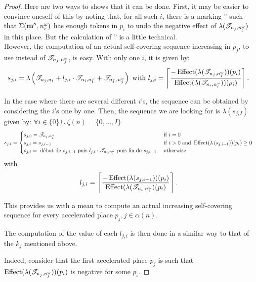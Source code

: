 \begin{proof}
  Here are two ways to shows that it can be done.
  First, it may be easier to convince oneself of this by noting that, for all such $i$, there is a marking \mar'' such that $\Sigma(\mathbf{m}'', n^\omega_i)$ has enough tokens in $p_i$ to undo the negative effect of $\lambda(\mathscr{T}_{n_j,n^\omega_j})$ in this place. But the calculation of \mar'' is a little technical.\\
   However, the computation of an actual self-covering sequence increasing in $p_j$, to use instead of $\mathscr{T}_{n_j, n^\omega_j}$, is easy. With only one $i$, it is given by:
   \[
     s_{j,i} = \lambda\left(\mathscr{T}_{n_j,n_i} + l_{j,i} \cdot \mathscr{T}_{n_i,n^\omega_i} + \mathscr{T}_{n^\omega_i,n^\omega_j}\right)
    \text{ with } l_{j,i} =
    \left\lceil \frac{-\operatorname{Effect}(\lambda(\mathscr{T}_{n_j,n^\omega_j}))(p_i)}
                     { \operatorname{Effect}(\lambda(\mathscr{T}_{n_i,n^\omega_i}))(p_i)} \right\rceil \text{.}\]

  In the case where there are several different $i$'s, the sequence can be obtained by considering the $i$'s one by one. Then, the sequence we are looking for is $\lambda\left(s_{j,I}\right)$ given by: $\forall i \in \{0\} \cup \zeta(n) = \{0, ..., I\}$
  \[
    s_{j,i} =
    \begin{cases}
      s_{j,0} = \mathscr{T}_{n_j,n^\omega_j}
        &\text{ if } i = 0 \\
      s_{j,i} = s_{j,i-1}
        &\text{ if } i > 0 \text{ and } \operatorname{Effect}(\lambda\left(s_{j,i-1}\right))(p_i) \geq 0 \\
      s_{j,i} = \text{ début de } s_{j,i-1} \text{ puis } l_{j,i} \cdot \mathscr{T}_{n_i,n^\omega_i} \text{ puis fin de } s_{j,i-1}
        &\text{ otherwise}
    \end{cases}
  \]
  with
  \[
    l_{j,i} = 
    \left\lceil \frac{-\operatorname{Effect}(\lambda(s_{j,i-1}))(p_i)}
                     { \operatorname{Effect}(\lambda(\mathscr{T}_{n_i,n^\omega_i})(p_i)} \right\rceil \text{.}
  \]

  This provides us with a mean to compute an actual increasing self-covering sequence for every accelerated place $p_j, j \in \alpha(n)$.

  The computation of the value of each $l_{j,i}$ is then done in a similar way to that of the $k_j$ mentioned above.

  Indeed, consider that the first accelerated place $p_j$ is such that $\operatorname{Effect}(\lambda(\mathscr{T}_{n_j,n^\omega_j}))(p_i)$ is negative for some $p_i$.




\end{proof}
